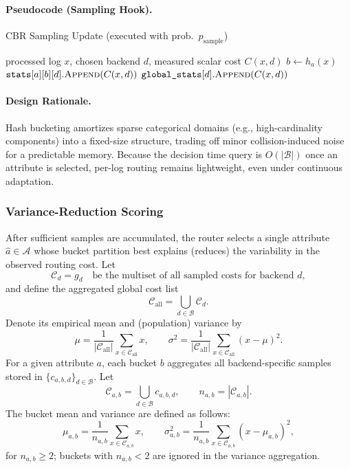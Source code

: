 \paragraph{Pseudocode (Sampling Hook).}
\begin{algorithm}[H]
\caption{CBR Sampling Update (executed with prob.\ $p_{\text{sample}}$)}
\label{alg:cbr-sample}
\begin{algorithmic}[1]
\Require processed log $x$, chosen backend $d$, measured scalar cost $C(x,d)$
  \State $b \gets h_a(x)$
  \State $\texttt{stats}[a][b][d].\textsc{Append}(C(x,d))$
\EndFor
\State $\texttt{global\_stats}[d].\textsc{Append}(C(x,d))$
\end{algorithmic}
\end{algorithm}

\paragraph{Design Rationale.}
Hash bucketing amortizes sparse categorical domains (e.g., high-cardinality components) into a fixed-size structure, trading off minor collision-induced noise for a predictable memory. Because the decision time query is $O(|\mathcal{B}|)$ once an attribute is selected, per-log routing remains lightweight, even under continuous adaptation.

\subsubsection{Variance-Reduction Scoring}
\label{subsubsec:cbr-variance}

After sufficient samples are accumulated, the router selects a single attribute $\hat{a} \in \mathcal{A}$ whose bucket partition best explains (reduces) the variability in the observed routing cost. Let
\[
\mathcal{C}_d = g_d \quad\text{be the multiset of all sampled costs for backend } d,
\]
and define the aggregated global cost list
\[
\mathcal{C}_{\text{all}} = \bigcup_{d \in \mathcal{B}} \mathcal{C}_d.
\]
Denote its empirical mean and (population) variance by
\[
\mu = \frac{1}{|\mathcal{C}_{\text{all}}|} \sum_{x \in \mathcal{C}_{\text{all}}} x, 
\qquad
\sigma^2 = \frac{1}{|\mathcal{C}_{\text{all}}|} \sum_{x \in \mathcal{C}_{\text{all}}} (x - \mu)^2.
\]
For a given attribute $a$, each bucket $b$ aggregates all backend-specific samples stored in $\{ c_{a,b,d} \}_{d \in \mathcal{B}}$. Let
\[
\mathcal{C}_{a,b} = \bigcup_{d \in \mathcal{B}} c_{a,b,d}, \qquad n_{a,b} = |\mathcal{C}_{a,b}|.
\]
The bucket mean and variance are defined as follows:
\[
\mu_{a,b} = \frac{1}{n_{a,b}} \sum_{x \in \mathcal{C}_{a,b}} x, \qquad
\sigma_{a,b}^2 = \frac{1}{n_{a,b}} \sum_{x \in \mathcal{C}_{a,b}} (x - \mu_{a,b})^2,
\]
for $n_{a,b} \ge 2$; buckets with $n_{a,b} < 2$ are ignored in the variance aggregation.

